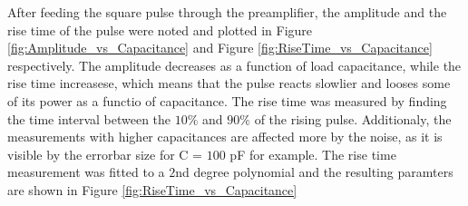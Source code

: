 \documentclass[12pt]{article}
\begin{document}
After feeding the square pulse through the preamplifier, the amplitude and the rise time of the pulse were noted and plotted in Figure \ref{fig:Amplitude_vs_Capacitance} and Figure \ref{fig:RiseTime_vs_Capacitance} respectively. The amplitude decreases as a function of load capacitance, while the rise time increasese, which means that the pulse reacts slowlier and looses some of its power as a functio of capacitance. The rise time was measured by finding the time interval between the $10\%$ and $90\%$ of the rising pulse. 
Additionaly, the measurements with higher capacitances are affected more by the noise, as it is visible by the errorbar size for C = $100$ pF for example. The rise time measurement was fitted to a $2$nd degree polynomial and the resulting paramters are shown in Figure \ref{fig:RiseTime_vs_Capacitance} 
\end{document}
